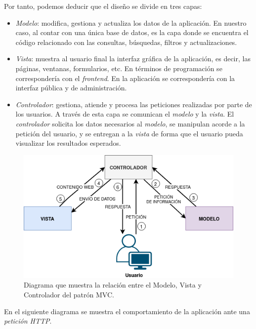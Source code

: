 \documentclass[
]{article}
\providecommand{\tightlist}{%
  \setlength{\itemsep}{0pt}\setlength{\parskip}{0pt}}
\begin{document}
Por tanto, podemos deducir que el diseño se divide en tres capas:

\begin{itemize}
\tightlist
\item
  \emph{Modelo}: modifica, gestiona y actualiza los datos de la
  aplicación. En nuestro caso, al contar con una única base de datos, es
  la capa donde se encuentra el código relacionado con las consultas,
  búsquedas, filtros y actualizaciones.
\item
  \emph{Vista}: muestra al usuario final la interfaz gráfica de la
  aplicación, es decir, las páginas, ventanas, formularios, etc. En
  términos de programación se correspondería con el \emph{frontend}. En
  la aplicación se correspondería con la interfaz pública y de
  administración.
\item
  \emph{Controlador}: gestiona, atiende y procesa las peticiones
  realizadas por parte de los usuarios. A través de esta capa se
  comunican el \emph{modelo} y la \emph{vista}. El \emph{controlador}
  solicita los datos necesarios al \emph{modelo}, se manipulan acorde a
  la petición del usuario, y se entregan a la \emph{vista} de forma que
  el usuario pueda visualizar los resultados esperados.
\end{itemize}

\begin{figure}
\hypertarget{da-mvc}{%
\centering
\includegraphics{../_static/images/mvc.png}
\caption{Diagrama que muestra la relación entre el Modelo, Vista y
Controlador del patrón MVC.}\label{da-mvc}
}
\end{figure}

En el siguiente diagrama se muestra el comportamiento de la aplicación
ante una \emph{petición HTTP}.
\end{document}
